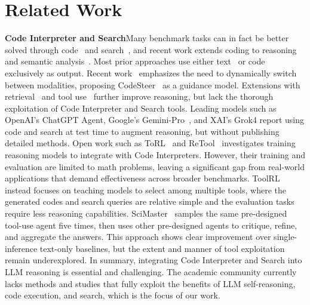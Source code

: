 \section{Related Work}
\textbf{Code Interpreter and Search}\quad Many benchmark tasks can in fact be better solved through code~\citep{pal} and search~\citep{Search-O1}, and recent work extends coding to reasoning and semantic analysis~\citep{chain-of-code,weir2024learning}. Most prior approaches use either text~\citep{Tree-of-thought} or code~\citep{codeplan-code-use-llm,code-based-self-verify} exclusively as output. Recent work~\citep{codesteering} emphasizes the need to dynamically switch between modalities, proposing CodeSteer~\citep{codesteer} as a guidance model. Extensions with retrieval~\citep{search-r1,Search-O1} and tool use~\citep{toolrl} further improve reasoning, but lack the thorough exploitation of Code Interpreter and Search tools. Leading models such as OpenAI’s ChatGPT Agent, Google’s Gemini-Pro~\citep{Gemini-2.5-Pro}, and XAI’s Grok4 report using code and search at test time to augment reasoning, but without publishing detailed methods. Open work such as ToRL~\citep{torl} and ReTool~\citep{retool} investigates training reasoning models to integrate with Code Interpreters. However, their training and evaluation are limited to math problems, leaving a significant gap from real-world applications that demand effectiveness across broader benchmarks. ToolRL~\citep{toolrl} instead focuses on teaching models to select among multiple tools, where the generated codes and search queries are relative simple and the evaluation tasks require less reasoning capabilities. SciMaster~\citep{chai2025scimaster} samples the same pre-designed tool-use agent five times, then uses other pre-designed agents to critique, refine, and aggregate the answers. This approach shows clear improvement over single-inference text-only baselines, but the extent and manner of tool exploitation remain underexplored. In summary, integrating Code Interpreter and Search into LLM reasoning is essential and challenging. The academic community currently lacks methods and studies that fully exploit the benefits of LLM self-reasoning, code execution, and search, which is the focus of our work.

